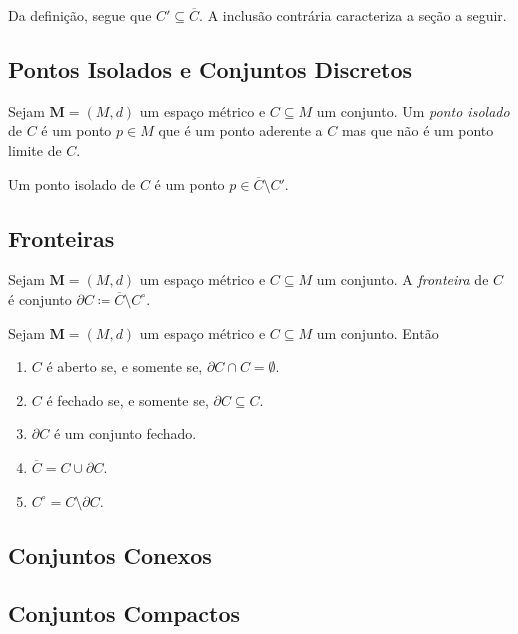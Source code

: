 Da definição, segue que $C' \subseteq \overline C$. A inclusão contrária caracteriza a seção a seguir.

\subsection{Pontos Isolados e Conjuntos Discretos}

\begin{defi}
	Sejam $\bm M = (M,d)$ um espaço métrico e $C \subseteq M$ um conjunto. Um \emph{ponto isolado} de $C$ é um ponto $p \in M$ que é um ponto aderente a $C$ mas que não é um ponto limite de $C$.
\end{defi}

	Um ponto isolado de $C$ é um ponto $p \in \overline C \setminus C'$.

\subsection{Fronteiras}

\begin{defi}
	Sejam $\bm M = (M,d)$ um espaço métrico e $C \subseteq M$ um conjunto. A \emph{fronteira} de $C$ é conjunto $\partial C \coloneqq \overline C \setminus C^\circ$.
\end{defi}

\begin{prop}
	Sejam $\bm M = (M,d)$ um espaço métrico e $C \subseteq M$ um conjunto. Então
	\begin{enumerate}
	\item $C$ é aberto se, e somente se, $\partial C \cap C = \emptyset$.
	\item $C$ é fechado se, e somente se, $\partial C \subseteq C$.
	\item $\partial C$ é um conjunto fechado.
	\item $\overline C = C \cup \partial C$.
	\item $C^\circ = C \setminus \partial C$.
	\end{enumerate}
\end{prop}

\subsection{Conjuntos Conexos}

\subsection{Conjuntos Compactos}